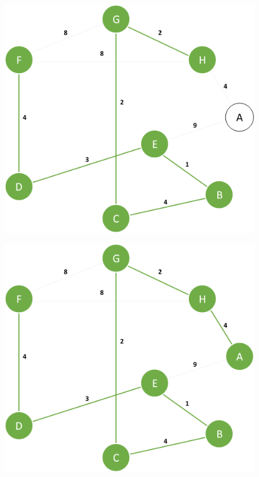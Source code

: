 \documentclass{article}
\begin{document}
\begin{figure}[H]
\centering
\includegraphics[scale=0.6]{images/Q3/07.png}
\end{figure}

\begin{figure}[H]
\centering
\includegraphics[scale=0.6]{images/Q3/08.png}
\end{figure}
\end{document}
